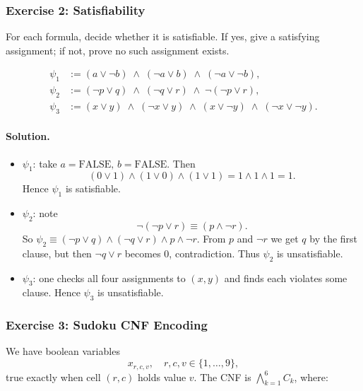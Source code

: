 \documentclass{article}
\theoremstyle{theorem}
\theoremstyle{definition}
\theoremstyle{remark}
\begin{document}
\subsubsection*{Exercise 2: Satisfiability}  
For each formula, decide whether it is satisfiable.  If yes, give a satisfying
assignment; if not, prove no such assignment exists.

\[
\begin{aligned}
\psi_1 &:= (a\lor\neg b)\;\land\;(\neg a\lor b)\;\land\;(\neg a\lor\neg b),\\
\psi_2 &:= (\neg p\lor q)\;\land\;(\neg q\lor r)\;\land\;\neg(\neg p\lor r),\\
\psi_3 &:= (x\lor y)\;\land\;(\neg x\lor y)\;\land\;(x\lor\neg y)\;\land\;(\neg x\lor\neg y).
\end{aligned}
\]

\paragraph{Solution.}
\begin{itemize}
  \item \(\psi_1\): take \(a=\mathrm{FALSE},\,b=\mathrm{FALSE}\).  Then
  \[
    (0\lor1)\land(1\lor0)\land(1\lor1)
    =1\land1\land1=1.
  \]
  Hence \(\psi_1\) is satisfiable.

  \item \(\psi_2\): note
  \[
    \neg(\neg p\lor r)\equiv(p\land\neg r).
  \]
  So \(\psi_2\equiv(\neg p\lor q)\land(\neg q\lor r)\land p\land\neg r\).
  From \(p\) and \(\neg r\) we get \(q\) by the first clause, but then
  \(\neg q\lor r\) becomes \(0\), contradiction.  Thus \(\psi_2\) is
  unsatisfiable.

  \item \(\psi_3\): one checks all four assignments to \((x,y)\) and finds
  each violates some clause.  Hence \(\psi_3\) is unsatisfiable.
\end{itemize}

\subsubsection*{Exercise 3: Sudoku CNF Encoding}  
We have boolean variables
\[
  x_{r,c,v},\quad
  r,c,v\in\{1,\dots,9\},
\]
true exactly when cell \((r,c)\) holds value \(v\).  The CNF is
\(\bigwedge_{k=1}^6 C_k\), where:
\end{document}
